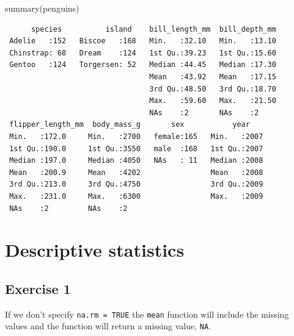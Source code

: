 \documentclass[
  letterpaper,
  DIV=11,
  numbers=noendperiod]{scrreprt}
\newenvironment{Shaded}{\begin{snugshade}}{\end{snugshade}}
\newcommand{\CommentTok}[1]{\textcolor[rgb]{0.37,0.37,0.37}{#1}}
\newcommand{\FunctionTok}[1]{\textcolor[rgb]{0.28,0.35,0.67}{#1}}
\newcommand{\NormalTok}[1]{\textcolor[rgb]{0.00,0.23,0.31}{#1}}
\newcommand{\SpecialCharTok}[1]{\textcolor[rgb]{0.37,0.37,0.37}{#1}}
\begin{document}
\begin{Shaded}
\begin{Highlighting}[]
\FunctionTok{summary}\NormalTok{(penguins)}
\end{Highlighting}
\end{Shaded}

\begin{verbatim}
      species          island    bill_length_mm  bill_depth_mm  
 Adelie   :152   Biscoe   :168   Min.   :32.10   Min.   :13.10  
 Chinstrap: 68   Dream    :124   1st Qu.:39.23   1st Qu.:15.60  
 Gentoo   :124   Torgersen: 52   Median :44.45   Median :17.30  
                                 Mean   :43.92   Mean   :17.15  
                                 3rd Qu.:48.50   3rd Qu.:18.70  
                                 Max.   :59.60   Max.   :21.50  
                                 NAs    :2       NAs    :2      
 flipper_length_mm  body_mass_g       sex           year     
 Min.   :172.0     Min.   :2700   female:165   Min.   :2007  
 1st Qu.:190.0     1st Qu.:3550   male  :168   1st Qu.:2007  
 Median :197.0     Median :4050   NAs   : 11   Median :2008  
 Mean   :200.9     Mean   :4202                Mean   :2008  
 3rd Qu.:213.0     3rd Qu.:4750                3rd Qu.:2009  
 Max.   :231.0     Max.   :6300                Max.   :2009  
 NAs    :2         NAs    :2                                 
\end{verbatim}

\section{Descriptive statistics}\label{descriptive-statistics-1}

\subsection{Exercise 1}\label{exercise-1-5}

If we don't specify \texttt{na.rm\ =\ TRUE} the \texttt{mean} function
will include the missing values and the function will return a missing
value, \texttt{NA}.

\begin{Shaded}
\end{Shaded}
\end{document}
